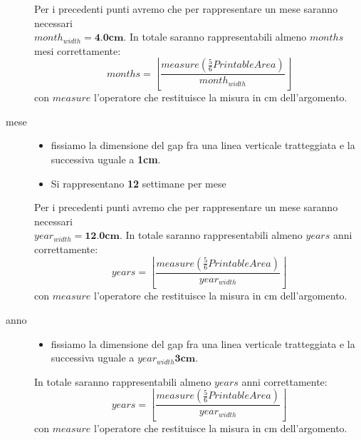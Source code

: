 \begin{description}
Per i precedenti punti avremo che per rappresentare un mese saranno
necessari\\ $month_{width} = \textbf{4.0cm}$. In totale saranno rappresentabili 
almeno $months$ mesi correttamente:
\begin{displaymath}
	months = \left \lfloor \frac{measure \left (\frac{5}{6}PrintableArea
	\right)}{month_{width}}\right \rfloor
\end{displaymath}
con $measure$ l'operatore che restituisce la misura in cm dell'argomento.

\item[mese] \quad
\begin{itemize}
  \item fissiamo la dimensione del gap fra una linea verticale tratteggiata
e la successiva uguale a \textbf{1cm}.
  \item Si rappresentano \textbf{12} settimane per mese
\end{itemize}

Per i precedenti punti avremo che per rappresentare un mese saranno
necessari\\ $year_{width} = \textbf{12.0cm}$. In totale saranno rappresentabili 
almeno $years$ anni correttamente:
\begin{displaymath}
	years = \left \lfloor \frac{measure \left (\frac{5}{6}PrintableArea
	\right)}{year_{width}}\right \rfloor
\end{displaymath}
con $measure$ l'operatore che restituisce la misura in cm dell'argomento.

\item[anno] \quad
\begin{itemize}
  \item fissiamo la dimensione del gap fra una linea verticale tratteggiata
e la successiva uguale a $year_{width}\textbf{3cm}$.
\end{itemize}

In totale saranno rappresentabili almeno $years$ anni correttamente:
\begin{displaymath}
	years = \left \lfloor \frac{measure \left (\frac{5}{6}PrintableArea
	\right)}{year_{width}}\right \rfloor
\end{displaymath}
con $measure$ l'operatore che restituisce la misura in cm dell'argomento.
\end{description}

